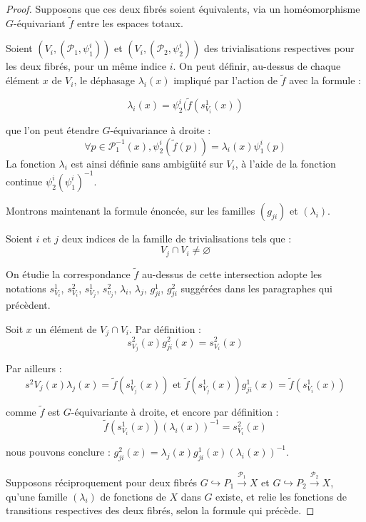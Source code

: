 \begin{proof}
Supposons que ces deux fibrés soient équivalents, via un homéomorphisme $G$-équivariant $\tilde{f}$ entre les espaces totaux.

\par
Soient $(V_i,(\mathcal{P}_1,\psi_1^i))$ et $(V_i,(\mathcal{P}_2,\psi_2^i))$ des trivialisations respectives pour les deux fibrés, pour un même indice $i$. %
On peut définir, au-dessus de chaque élément $x$ de $V_i$, le déphasage $\lambda_i(x)$ impliqué par l'action de $\tilde{f}$ avec la formule :

\[\lambda_i(x) = \psi_2^i(\tilde{f}(s_{V_i}^1(x))\]

que l'on peut étendre $G$-équivariance à droite :
\[\forall p \in \mathcal{P}_1^{-1}(x) , \psi_2^i(\tilde{f}(p)) = \lambda_i(x) \psi_1^i(p)\]
La fonction $\lambda_i$ est ainsi définie sans ambigüité sur $V_i$, à l'aide de la fonction continue $\psi_2^i (\psi_1^i)^{-1}$.

\par
Montrons maintenant la formule énoncée, sur les familles $(g_{ji})$ et $(\lambda_i)$.

\par
Soient $i$ et $j$ deux indices de la famille de trivialisations tels que :
\[V_j \cap V_i \neq \varnothing\]

On \'etudie la correspondance $\tilde{f}$ au-dessus de cette intersection adopte les notations %
$s^1_{V_i}$, $s^2_{V_i}$, $s^1_{V_j}$, $s^2_{v_j}$, $\lambda_i$, $\lambda_j$, $g^1_{ji}$, $g^2_{ji}$ suggérées dans les paragraphes qui précèdent.

\par
Soit $x$ un élément de $V_j \cap V_i$. Par définition :
\[s^2_{V_j}(x) g_{ji}^2(x) = s^2_{V_i}(x)\]

Par ailleurs :
\[s^2{V_j}(x) \lambda_j(x) = \tilde{f}(s^1_{V_j}(x))\text{ et }\tilde{f}(s^1_{V_j}(x)) g^1_{ji}(x) = \tilde{f} (s^1_{V_i}(x))\]

comme $\tilde{f}$ est $G$-équivariante à droite, et encore par définition :
\[\tilde{f}(s^1_{V_i}(x)) (\lambda_i(x))^{-1} = s^2_{V_i}(x)\]

nous pouvons conclure : $g_{ji}^2(x) = \lambda_j(x) g^1_{ji}(x) (\lambda_i(x))^{-1}$.

Supposons réciproquement pour deux fibrés $G \hookrightarrow P_1 \xrightarrow{\mathcal{P}_1} X$ %
et $G \hookrightarrow P_2 \xrightarrow{\mathcal{P}_2} X$, qu'une famille $(\lambda_i)$ de fonctions de $X$ dans $G$ existe, %
et relie les fonctions de transitions respectives des deux fibrés, selon la formule qui précède.


\end{proof}
